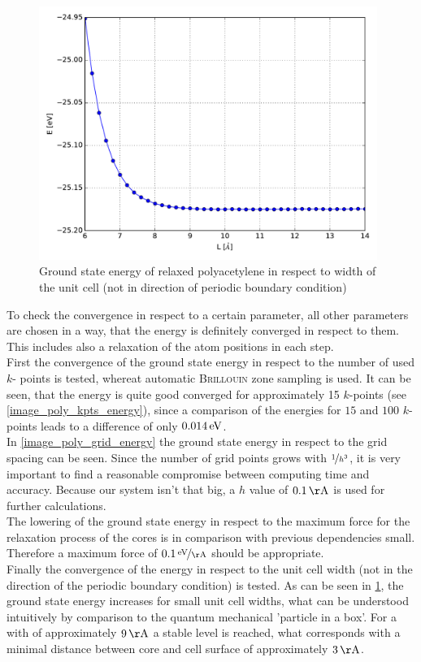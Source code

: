 \begin{figure}[!p]
	\centering
	\includegraphics[width = 11cm]{Images/polyacetylene/convergence/unit_cell_width}
	\caption{Ground state energy of relaxed polyacetylene in respect to width of the unit cell (not in direction of periodic boundary condition)}
	\label{image_poly_width_energy}
\end{figure}
To check the convergence in respect to a certain parameter, all other parameters are chosen in a way, that the energy is definitely converged in respect to them. This includes also a relaxation of the atom positions in each step.\\
First the convergence of the ground state energy in respect to the number of used $k$- points is tested, whereat automatic \textsc{Brillouin} zone sampling is used. It can be seen, that the energy is quite good converged for approximately 15 $k$-points (see \cref{image_poly_kpts_energy}), since a comparison of the energies for $15$ and $100$ $k$-points leads to a difference of only $\unit[0.014]{eV}$.\\
In \cref{image_poly_grid_energy} the ground state energy in respect to the grid spacing can be seen. Since the number of grid points grows with $\nicefrac{1}{h^3}$, it is very important to find a reasonable compromise between computing time and accuracy. Because our system isn't that big, a $h$ value of $\unit[0.1]{\AA}$ is used for further calculations.\\
The lowering of the ground state energy in respect to the maximum force for the relaxation process of the cores is in comparison with previous dependencies small. Therefore a maximum force of $\unitfrac[0.1]{eV}{\AA}$ should be appropriate.\\
Finally the convergence of the energy in respect to the unit cell width (not in the direction of the periodic boundary condition) is tested. As can be seen in \cref{image_poly_width_energy}, the ground state energy increases for small unit cell widths, what can be understood intuitively by comparison to the quantum mechanical 'particle in a box'. For a with of approximately $\unit[9]{\AA}$ a stable level is reached, what corresponds with a minimal distance between core and cell surface of approximately $\unit[3]{\AA}$.



